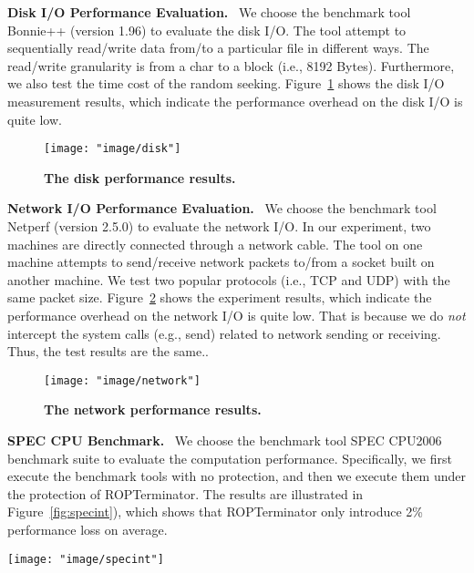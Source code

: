 \textbf{Disk I/O Performance Evaluation.}~
We choose the benchmark tool Bonnie++ (version 1.96) to evaluate the disk I/O. The tool attempt to sequentially read/write data from/to a particular file in different ways. The read/write granularity is from a char to a block (i.e., 8192 Bytes). Furthermore, we also test the time cost of the random seeking. Figure~\ref{fig:disk} shows the disk I/O measurement results, which indicate the performance overhead on the disk I/O is quite low.

\begin{figure}[!ht]
 \centering
\texttt{[image: "image/disk"]}
\caption{\textbf{The disk performance results.} }\label{fig:disk}
\end{figure}

\textbf{Network I/O Performance Evaluation.}~
We choose the benchmark tool Netperf (version 2.5.0) to evaluate the network I/O. In our experiment, two machines are directly connected through a network cable. The tool on one machine attempts to send/receive network packets to/from a socket built on another machine. We test two popular protocols (i.e., TCP and UDP) with the same packet size. Figure~\ref{fig:network} shows the experiment results, which indicate the performance overhead on the network I/O is quite low. That is because  we do \emph{not} intercept the system calls (e.g., send) related to network sending or receiving. Thus, the test results are the same..

\begin{figure}[!ht]
 \centering
\texttt{[image: "image/network"]}
\caption{\textbf{The network performance results.} }\label{fig:network}
\end{figure}

\textbf{SPEC CPU Benchmark.}~
We choose the benchmark tool SPEC CPU2006 benchmark suite to evaluate the computation performance. Specifically, we first execute the benchmark tools with no protection, and then we execute them under the protection of ROPTerminator. The results are illustrated in Figure~\ref{fig:specint}), which shows that ROPTerminator only introduce 2\% performance loss on average.

\begin{figure*}[!ht]
 \centering
\texttt{[image: "image/specint"]}
\caption{\textbf{The SPEC INT2006 Benchmark Results.} The optimized algorithm generally reduces the performance overhead compared to the basic one. }\label{fig:specint}
\end{figure*}
